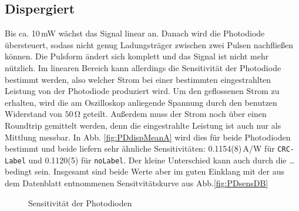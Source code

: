 \documentclass[bachelor,       %
               twoside,        %
               BCOR10mm,       %
               english,ngerman, %
               ]{GAUBM}
\begin{document}
\subsection{Dispergiert}
Bis ca. 10\,mW wächst das Signal linear an.
Danach wird die Photodiode übersteuert, sodass nicht genug Ladungsträger zwischen zwei Pulsen nachfließen können.
Die Pulsform ändert sich komplett und das Signal ist nicht mehr nützlich.
Im linearen Bereich kann allerdings die Sensitivität der Photodiode bestimmt werden, also welcher Strom bei einer bestimmten eingestrahlten Leistung von der Photodiode produziert wird.
Um den geflossenen Strom zu erhalten, wird die am Oszilloskop anliegende Spannung durch den benutzen Widerstand von $50\,\si\ohm$ geteilt.
Außerdem muss der Strom noch über einen Roundtrip gemittelt werden, denn die eingestrahlte Leistung ist auch nur als Mittlung messbar.
In Abb. \ref{fig:PDdispMeanA} wird dies für beide Photodioden bestimmt und beide liefern sehr ähnliche Sensitivitäten: 0.1154(8)\,A/W für  \texttt{CRC-Label} und  0.1120(5) für \texttt{noLabel}.
Der kleine Unterschied kann auch durch die \dots bedingt sein.
Insgesamt sind beide Werte aber im guten Einklang mit der aus dem Datenblatt entnommenen Sensitvitätskurve aus Abb.\ref{fig:PDsensDB}

\begin{figure}[!htb]
	\centering
   \hfill
	\caption{Sensitivität der Photodioden}
	\label{fig:PDsens}
\end{figure}
\end{document}
